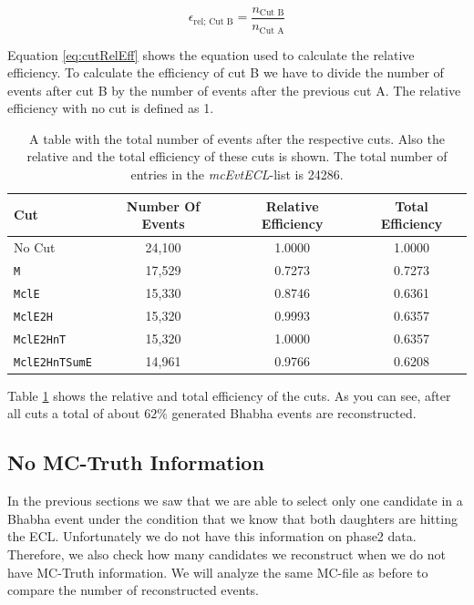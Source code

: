 \documentclass[a4paper,11pt,twosided,final,german,openbib,pdftex,listof=totoc,bibliography=totoc]{scrbook}
\begin{document}
\begin{equation}
	\epsilon_{\textrm{rel; Cut B}} = \frac{n_{\textrm{Cut B}}}{n_{\textrm{Cut A}}}
	\label{eq:cutRelEff}
\end{equation}

Equation \ref{eq:cutRelEff} shows the equation used to calculate the relative efficiency. To calculate the efficiency of cut B we have to divide the number of events after cut B by the number of events after the previous
cut A. The relative efficiency with no cut is defined as 1.

\begin{table}[h!]
	\centering
\begin{tabular}{lccc}
 Cut& Number Of Events&  Relative Efficiency& Total Efficiency\\
 \hline
 No Cut&24,100 &1.0000 &1.0000 \\
 \texttt{M}& 17,529&0.7273 &0.7273 \\
 \texttt{MclE}&15,330 &0.8746 &0.6361 \\
 \texttt{MclE2H}&15,320&0.9993  &0.6357 \\
 \texttt{MclE2HnT}&15,320 &1.0000 &0.6357 \\
 \texttt{MclE2HnTSumE}& 14,961 &0.9766 &0.6208 \\

\end{tabular}

\caption[Cut Efficiencies]{A table with the total number of events after the respective cuts. Also the relative and the total efficiency of these cuts is shown. The total number of entries in the \textit{mcEvtECL}-list is 24286.}
\label{tab:cutEff}
\end{table}

Table \ref{tab:cutEff} shows the relative and total efficiency of the cuts.
As you can see, after all cuts a total of about $62\%$ generated Bhabha events are reconstructed. 

\subsection{No MC-Truth Information}
\label{sec:NoMCT}

In the previous sections we saw that we are able to select only one candidate in a Bhabha event under the condition that we know that both daughters are hitting the ECL. Unfortunately we do not have this information on phase2 data. Therefore, we also check how many candidates we reconstruct when we do not have MC-Truth information. We will analyze the same MC-file as before to compare the number of reconstructed events. 
\end{document}
